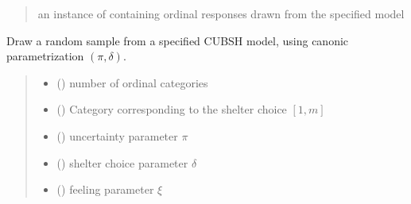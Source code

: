 \documentclass[letterpaper,10pt,english]{sphinxmanual}
\begin{document}
\begin{fulllineitems}
\begin{quote}
\begin{description}
\begin{itemize}
\end{itemize}

\sphinxAtStartPar
an instance of  containing ordinal responses drawn from the specified model

\end{description}\end{quote}

\end{fulllineitems}


\begin{fulllineitems}
\label{\detokenize{cubmods:cubmods.cubsh.draw2}}
\pysigstartsignatures
{}
\pysigstopsignatures
\sphinxAtStartPar
Draw a random sample from a specified CUBSH model,
using canonic parametrization \((\pi, \delta)\).
\begin{quote}\begin{description}
\begin{itemize}
\item {} 
\sphinxAtStartPar
{} () \textendash{} number of ordinal categories

\item {} 
\sphinxAtStartPar
{} () \textendash{} Category corresponding to the shelter choice \([1,m]\)

\item {} 
\sphinxAtStartPar
{} () \textendash{} uncertainty parameter \(\pi\)

\item {} 
\sphinxAtStartPar
{} () \textendash{} shelter choice parameter \(\delta\)

\item {} 
\sphinxAtStartPar
{} () \textendash{} feeling parameter \(\xi\)


\end{itemize}
\end{description}
\end{quote}
\end{fulllineitems}
\end{document}
